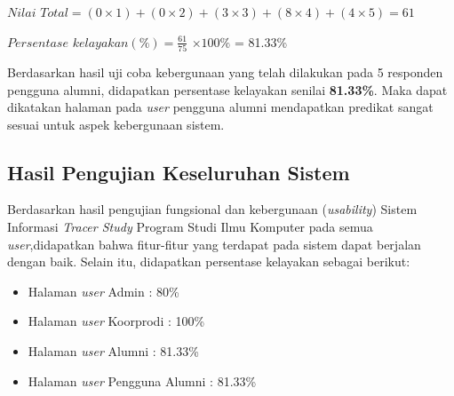 \begin{enumerate}
	
	$Nilai$ $Total = (0 \times 1) + (0 \times 2) + (3 \times 3) + (8 \times 4) + (4 \times 5) = 61$
	
	$Persentase$ $kelayakan (\%) = \frac{61}{75} $ $\times 100\%$ = 81.33\%
	
	Berdasarkan hasil uji coba kebergunaan yang telah dilakukan pada 5 responden pengguna alumni, didapatkan persentase kelayakan senilai \textbf{81.33\%}. Maka dapat dikatakan halaman pada \textit{user} pengguna alumni mendapatkan predikat sangat sesuai untuk aspek kebergunaan sistem.
	
\end{enumerate}






\subsection{Hasil Pengujian Keseluruhan Sistem}
Berdasarkan hasil pengujian fungsional dan kebergunaan (\textit{usability}) Sistem Informasi \textit{Tracer Study} Program Studi Ilmu Komputer pada semua \textit{user},didapatkan bahwa fitur-fitur yang terdapat pada sistem dapat berjalan dengan baik. Selain itu, didapatkan persentase kelayakan sebagai berikut:
 
\begin{itemize}
	\item Halaman \textit{user} Admin : 80\%
	\item Halaman \textit{user} Koorprodi : 100\%
	\item Halaman \textit{user} Alumni : 81.33\%
	\item Halaman \textit{user} Pengguna Alumni : 81.33\%
\end{itemize}

